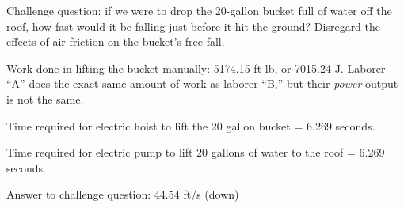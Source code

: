 Challenge question: if we were to drop the 20-gallon bucket full of water off the roof, how fast would it be falling just before it hit the ground?  Disregard the effects of air friction on the bucket's free-fall.







Work done in lifting the bucket manually: 5174.15 ft-lb, or 7015.24 J.  Laborer ``A'' does the exact same amount of work as laborer ``B,'' but their {\it power} output is not the same.

\vskip 10pt

Time required for electric hoist to lift the 20 gallon bucket = 6.269 seconds.  

Time required for electric pump to lift 20 gallons of water to the roof = 6.269 seconds.

\vskip 10pt

Answer to challenge question: 44.54 ft/s (down)











